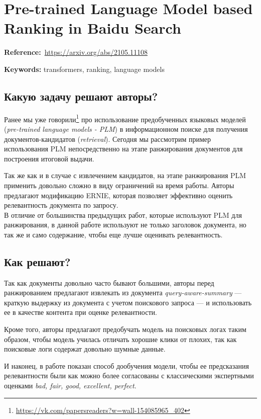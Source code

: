 \chapter{Pre-trained Language Model based Ranking in Baidu Search}

\textbf{Reference:}~\url{https://arxiv.org/abs/2105.11108}

\textbf{Keywords:} transformers, ranking, language models

\section*{Какую задачу решают авторы?}

Ранее мы уже говорили\footnote{\url{https://vk.com/papersreaders?w=wall-154085965_402}} про использование предобученных языковых моделей (\textit{pre-trained language models - PLM}) в информационном поиске для получения документов-кандидатов (\textit{retrieval}).
Сегодня мы рассмотрим пример использования PLM непосредственно на этапе ранжирования документов для построения итоговой выдачи.

Так же как и в случае с извлечением кандидатов, на этапе ранжирования PLM применить довольно сложно в виду ограничений на время работы.
Авторы предлагают модификацию ERNIE, которая позволяет эффективно оценить релевантность документа по запросу. \\

В отличие от большинства предыдущих работ, которые используют PLM для ранжирования, в данной работе используют не только заголовок документа, но так же и само содержание, чтобы еще лучше оценивать релевантность.

\section*{Как решают?}

Так как документы довольно часто бывают большими, авторы перед ранжированием предлагают извлекать из документа \textit{query-aware-summary} --- краткую выдержку из документа с учетом поискового запроса --- и использовать ее в качестве контента при оценке релевантности.

Кроме того, авторы предлагают предобучать модель на поисковых логах таким образом, чтобы модель училась отличать хорошие клики от плохих, так как поисковые логи содержат довольно шумные данные.

И наконец, в работе показан способ дообучения модели, чтобы ее предсказания релевантности были как можно более согласованы с классическими экспертными оценками \textit{bad, fair, good, excellent, perfect}. \\

